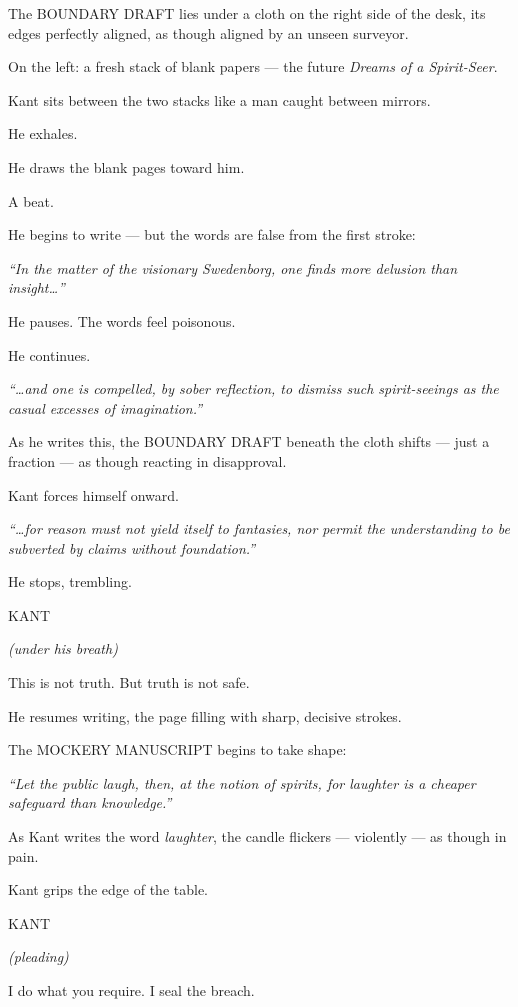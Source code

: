 \documentclass[12pt]{article}
\newenvironment{dialogue}[1]{%
  \vspace{0.8\baselineskip}%
  \noindent\hspace*{2.3in}\textsc{#1}\par%
  \noindent\hspace*{1.5in}\begin{minipage}[t]{4.5in}%
}{%
  \end{minipage}\par%
}
\newcommand{\paren}[1]{%
  \noindent\hspace*{1.8in}\textit{(#1)}\par%
}
\begin{document}
The BOUNDARY DRAFT lies under a cloth on the right side of the desk,
its edges perfectly aligned, as though aligned by an unseen surveyor.

On the left: a fresh stack of blank papers — the future \textit{Dreams
of a Spirit-Seer}.

Kant sits between the two stacks like a man caught between mirrors.

He exhales.

He draws the blank pages toward him.

A beat.

He begins to write — but the words are false from the first stroke:

\textit{“In the matter of the visionary Swedenborg, one finds more
delusion than insight…”}

He pauses. The words feel poisonous.

He continues.

\textit{“…and one is compelled, by sober reflection, to dismiss such
spirit-seeings as the casual excesses of imagination.”}

As he writes this, the BOUNDARY DRAFT beneath the cloth shifts — just
a fraction — as though reacting in disapproval.

Kant forces himself onward.

\textit{“…for reason must not yield itself to fantasies, nor permit the
understanding to be subverted by claims without foundation.”}

He stops, trembling.

\begin{dialogue}{KANT}
\paren{under his breath}
This is not truth.  
But truth is not safe.
\end{dialogue}

He resumes writing, the page filling with sharp, decisive strokes.

The MOCKERY MANUSCRIPT begins to take shape:

\textit{
“Let the public laugh, then, at the notion of spirits,  
for laughter is a cheaper safeguard than knowledge.”}

As Kant writes the word \textit{laughter}, the candle flickers —
violently — as though in pain.

Kant grips the edge of the table.

\begin{dialogue}{KANT}
\paren{pleading}
I do what you require.  
I seal the breach.
\end{dialogue}
\end{document}
